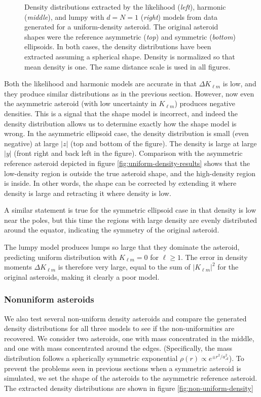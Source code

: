 \documentclass[fleqn,usenatbib]{mnras}
\begin{document}
\begin{figure}
  \caption{Density distributions extracted by the likelihood (\textit{left}), harmonic (\textit{middle}), and lumpy with $d=N=1$ (\textit{right}) models from data generated for a uniform-density asteroid. The original asteroid shapes were the reference asymmetric (\textit{top}) and symmetric (\textit{bottom}) ellipsoids. In both cases, the density distributions have been extracted assuming a spherical shape. Density is normalized so that mean density is one. The same distance scale is used in all figures.}
  \label{fig:sphere-density}
\end{figure}

Both the likelihood and harmonic models are accurate in that $\Delta K_{\ell m}$ is low, and they produce similar distributions as in the previous section. However, now even the asymmetric asteroid (with low uncertainty in $K_{\ell m}$) produces negative densities. This is a signal that the shape model is incorrect, and indeed the density distribution allows us to determine exactly how the shape model is wrong. In the asymmetric ellipsoid case, the density distribution is small (even negative) at large $|z|$ (top and bottom of the figure). The density is large at large $|y|$ (front right and back left in the figure). Comparison with the asymmetric reference asteroid depicted in figure \ref{fig:uniform-density-results} shows that the low-density region is outside the true asteroid shape, and the high-density region is inside. In other words, the shape can be corrected by extending it where density is large and retracting it where density is low.

A similar statement is true for the symmetric ellipsoid case in that density is low near the poles, but this time the regions with large density are evenly distributed around the equator, indicating the symmetry of the original asteroid.

The lumpy model produces lumps so large that they dominate the asteroid, predicting uniform distribution with $K_{\ell m} = 0$ for $\ell \geq 1$. The error in density moments $\Delta K_{\ell m}$ is therefore very large, equal to the sum of $|K_{\ell m}|^2$ for the original asteroids, making it clearly a poor model.


\subsubsection{Nonuniform asteroids}
\label{sec:non-uniform-density}

We also test several non-uniform density asteroids and compare the generated density distributions for all three models to see if the non-uniformities are recovered. We consider two asteroids, one with mass concentrated in the middle, and one with mass concentrated around the edges. (Specifically, the mass distribution follows a spherically symmetric exponential $\rho(r) \propto e^{\pm r^2/a_\mathcal{A}^2}$). To prevent the problems seen in previous sections when a symmetric asteroid is simulated, we set the shape of the asteroids to the asymmetric reference asteroid. The extracted density distributions are shown in figure \ref{fig:non-uniform-density}
\end{document}
